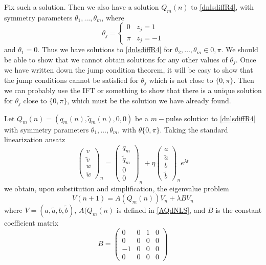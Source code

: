 \documentclass[12pt]{article}
\begin{document}
Fix such a solution. Then we also have a solution $Q_m(n)$ to \eqref{dnlsdiffR4}, with symmetry parameters $\theta_1, \dots, \theta_m$, where
\[
\theta_j = \begin{cases}
0 & z_j = 1 \\
\pi & z_j = -1
\end{cases}
\]
and $\theta_1 = 0$. Thus we have solutions to \eqref{dnlsdiffR4} for $\theta_2, \dots, \theta_m \in {0, \pi}$. We should be able to show that we cannot obtain solutions for any other values of $\theta_j$. Once we have written down the jump condition theorem, it will be easy to show that the jump conditions cannot be satisfied for $\theta_j$ which is not close to $\{0, \pi\}$. Then we can probably use the IFT or something to show that there is a unique solution for $\theta_j$ close to $\{0, \pi\}$, which must be the solution we have already found.

Let $Q_m(n) = (q_m(n), \tilde{q}_m(n), 0, 0)$ be a $m-$pulse solution to \eqref{dnlsdiffR4} with symmetry parameters $\theta_1, \dots, \theta_m$, with $\theta \{0, \pi\}$. Taking the standard linearization ansatz
\[
\begin{pmatrix}v \\ \tilde{v} \\ w \\ \tilde{w} \end{pmatrix}_n = 
\begin{pmatrix}q_m \\ \tilde{q}_m \\ 0 \\ 0 \end{pmatrix}_n + 
\eta \begin{pmatrix}a \\ \tilde{a} \\ b \\ \tilde{b} \end{pmatrix}_n e^{\lambda t}
\]
we obtain, upon substitution and simplification, the eigenvalue problem 
\begin{equation}\label{dNLSEVP}
V(n+1) = A(Q_m(n)) V_n + \lambda B V_n
\end{equation}
where $V = (a, \tilde{a}, b, \tilde{b})$, $A(Q_m(n)$ is defined in \eqref{AQdNLS}, and $B$ is the constant coefficient matrix 
\[
B = 
\begin{pmatrix}
0 & 0 & 1 & 0 \\
0 & 0 & 0 & 0 \\
-1 & 0 & 0 & 0 \\
0 & 0 & 0 & 0
\end{pmatrix}
\]
\end{document}
